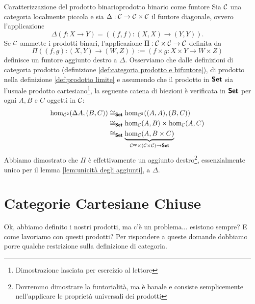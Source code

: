 \documentclass{article}
\renewcommand\C{\mc{C}}
\begin{document}
\begin{theorem}{Caratterizzazione del prodotto binario}{prodotto binario come funtore}
    Sia $\C$ una categoria localmente piccola e sia $\Delta :\C\to\C\times\C$ il funtore diagonale, ovvero l'applicazione
    \[ \Delta( f:X\to Y ) = ((f,f):(X,X)\to(Y,Y)).\]
    Se $\C$ ammette i prodotti binari, l'applicazione $\Pi : \C\times\C \to \C$ definita da
    \[\Pi((f,g):(X,Y)\to(W,Z)) := (f\times g : X\times Y \to W\times Z) \]
    definisce un funtore aggiunto destro a $\Delta$.
    \proof
    Osserviamo che dalle definizioni di categoria prodotto (definizione \ref{def:categoria prodotto e bifuntore}), di prodotto nella definizione \ref{def:prodotto limite} e assumendo che il prodotto in $\text{\sffamily\textbf{Set}}$ sia l'usuale prodotto cartesiano\footnote{Dimostrazione lasciata per esercizio al lettore}, la seguente catena di biezioni è verificata in $\text{\sffamily\textbf{Set}}$ per ogni $A,B$ e $C$ oggetti in $\C$:
    \[\begin{aligned}
        \hom_{\C^2}(\Delta A,(B,C)) & \cong_\setcat \hom_{\C^2}((A,A),(B,C))\\
        & \cong_\setcat \hom_\C(A,B)\times \hom_\C(A,C)\\
        & \cong_\setcat \underbrace{\hom_\C(A, B\times C)}_{\C^\op \times (\C\times\C) \to \setcat}
    \end{aligned} \]
    Abbiamo dimostrato che $\Pi$ è effettivamente un aggiunto destro\footnote{Dovremmo dimostrare la funtorialità, ma è banale e consiste semplicemente nell'applicare le proprietà universali dei prodotti}, essenzialmente unico per il lemma \ref{lem:unicità degli aggiunti}, a $\Delta$.
\end{theorem}

\pagebreak

\section{Categorie Cartesiane Chiuse}

Ok, abbiamo definito i nostri prodotti, ma c'è un problema... esistono sempre? E come lavoriamo con questi prodotti? Per rispondere a queste domande dobbiamo porre qualche restrizione sulla definizione di categoria.
\end{document}
